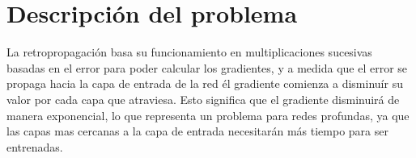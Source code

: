 




\section{Descripción del problema}
La retropropagación basa su funcionamiento en multiplicaciones sucesivas basadas en el error para poder calcular los gradientes, y a medida que el error se propaga hacia la capa de entrada de la red él gradiente comienza a disminuír su valor por cada capa que atraviesa. Esto significa que el gradiente disminuirá de manera exponencial, lo que representa un problema para redes profundas, ya que las capas mas cercanas a la capa de entrada necesitarán más tiempo para ser entrenadas.

